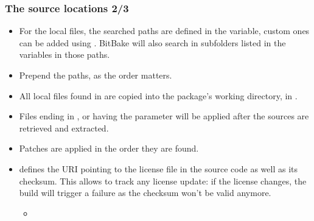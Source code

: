 \begin{frame}
  \frametitle{The source locations 2/3}
  \begin{itemize}
    \item For the local files, the searched paths are defined in the
       variable, custom ones can be added using
      . BitBake will also search in subfolders
      listed in the  variables in those paths.
    \item Prepend the paths, as the order matters.
    \item All local files found in  are copied into the
      package's working directory, in .
    \item Files ending in ,  or having the
       parameter will be applied after the sources are
      retrieved and extracted.
    \item Patches are applied in the order they are found.
    \item {} defines the URI pointing to the
      license file in the source code as well as its checksum. This
      allows to track any license update: if the license changes, the
      build will trigger a failure as the checksum won't be valid
      anymore.
      \begin{itemize}
        \item {}
      \end{itemize}
  \end{itemize}
\end{frame}

